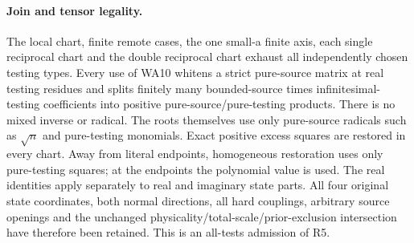 \paragraph{Join and tensor legality.}
The local chart, finite remote cases, the one small-a finite axis,
each single reciprocal chart and the double reciprocal chart exhaust
all independently chosen testing types. Every use of WA10 whitens a
strict pure-source matrix at real testing residues and splits finitely
many bounded-source times infinitesimal-testing coefficients into
positive pure-source/pure-testing products. There is no mixed inverse
or radical. The roots themselves use only pure-source radicals such
as $\sqrt n$ and pure-testing monomials. Exact positive excess squares
are restored in every chart. Away from literal endpoints, homogeneous
restoration uses only pure-testing squares; at the endpoints the
polynomial value is used. The real identities apply separately to real
and imaginary state parts. All four original state coordinates, both
normal directions, all hard couplings, arbitrary source openings and
the unchanged physicality/total-scale/prior-exclusion intersection
have therefore been retained. This is an all-tests admission of R5.

